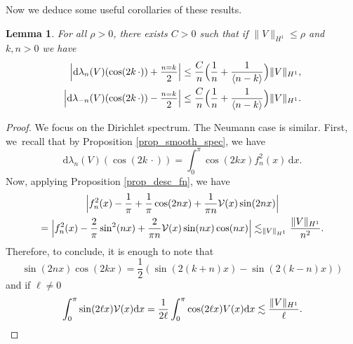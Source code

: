 \documentclass[11pt]{article}
\makeatletter
\DeclareRobustCommand{\mathbbm}[1]{\csname jepbb@#1\endcsname}
\newtheorem{lemma}[theorem]{Lemma}
\theoremstyle{definition}
\makeatother
\begin{document}
Now we deduce some useful corollaries of these results.

\begin{lemma} \label{lem_est_der} For all $\rho>0$, there exists $C>0$ such that if $\|V\|_{H^1}\leq \rho$ and $k,n>0$ we have
\begin{align*}
\Bigl| \mathrm{d}\lambda_n(V)(\cos(2k\,\cdot )) + \frac{\mathbbm{1}_{n=k}}2 \Bigr|&\leq \frac C{n } \Bigl(\frac{1}n + \frac1{\langle n-k \rangle} \Bigr)\|V\|_{H^1},
\\
\Bigl| \mathrm{d}\lambda_{-n}(V)(\cos(2k\,\cdot )) - \frac{\mathbbm{1}_{n=k}}2 \Bigr|&\leq \frac C{n } \Bigl(\frac{1}n + \frac1{\langle n-k \rangle} \Bigr) \|V\|_{H^1}.
\end{align*}
\end{lemma}
\begin{proof} We focus on the Dirichlet spectrum. The Neumann case is similar.
First, we~recall that by Proposition \ref{prop_smooth_spec}, we have
\[
\mathrm{d}\lambda_n(V)(\cos(2k\,\cdot )) = \int_0^\pi \cos(2kx) f_n^2(x) \, \mathrm{d}x.
\]
Now, applying Proposition \ref{prop_desc_fn}, we have
\begin{multline*}
\Bigl|f_n^2(x) - \frac1\pi + \frac1\pi \cos(2nx) + \frac1{\pi n} \mathcal{V}(x) \sin(2n x) \Bigr| \\
=\Bigl|f_n^2(x) - \frac2\pi \sin^2(nx) + \frac2{\pi n} \mathcal{V}(x) \sin(n x) \cos(n x) \Bigr|
\lesssim_{\|V\|_{H^1}} \frac{\|V\|_{H^1}}{n^2}.
\end{multline*}
Therefore, to conclude, it is enough to note that
\[
\sin(2nx) \cos(2kx) = \frac12(\sin(2(k+n)x) - \sin(2(k-n)x))
\]
and if $\ell \neq 0$
\[
\int_0^\pi \sin(2\ell x) \mathcal{V}(x) \mathrm{d}x =\frac1{2\ell} \int_0^\pi \cos(2\ell x) V(x) \mathrm{d}x \lesssim \frac{\|V\|_{H^1}}{\ell}.\qedhere
\]
\end{proof}
\end{document}
